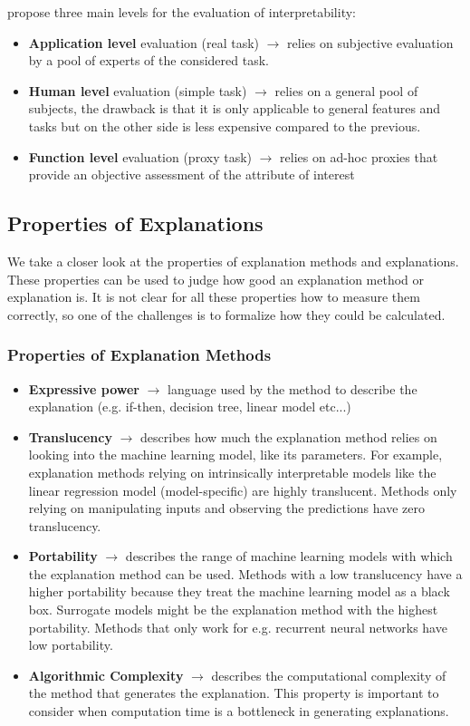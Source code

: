 \cite{DoshiVelez2017TowardsAR} propose three main levels for the evaluation of interpretability:
\begin{itemize}
    \item \textbf{Application level} evaluation (real task) $\rightarrow$ relies on subjective evaluation by a pool of experts
    of the considered task.
    \item \textbf{Human level} evaluation (simple task) $\rightarrow$ relies on a general pool of subjects, the drawback is that it is only applicable to
    general features and tasks but on the other side is less expensive compared to the previous.
    \item \textbf{Function level} evaluation (proxy task) $\rightarrow$ relies on ad-hoc proxies that provide an objective
    assessment of the attribute of interest
\end{itemize}

\subsection{Properties of Explanations}
We take a closer look at the properties of explanation methods and explanations. These properties can be used to judge how good an explanation method or explanation is. 
It is not clear for all these properties how to measure them correctly, so one of the challenges is to formalize how they could be calculated.
\subsubsection{Properties of Explanation Methods}
\begin{itemize}
    \item \textbf{Expressive power} $\rightarrow$ language used by the method to describe the explanation (e.g. if-then,
    decision tree, linear model etc...)
    \item \textbf{Translucency} $\rightarrow$ describes how much the explanation method relies on looking into the machine learning model, like its parameters. 
    For example, explanation methods relying on intrinsically interpretable models like the linear regression model (model-specific) are highly translucent. 
    Methods only relying on manipulating inputs and observing the predictions have zero translucency.
    \item \textbf{Portability} $\rightarrow$ describes the range of machine learning models with which the explanation method can be used. Methods with a low translucency 
    have a higher portability because they treat the machine learning model as a black box. Surrogate models might be the explanation method with the highest portability. 
    Methods that only work for e.g. recurrent neural networks have low portability.
    \item \textbf{Algorithmic Complexity} $\rightarrow$ describes the computational complexity of the method that generates the explanation. This property is important to consider when 
    computation time is a bottleneck in generating explanations.
\end{itemize}

